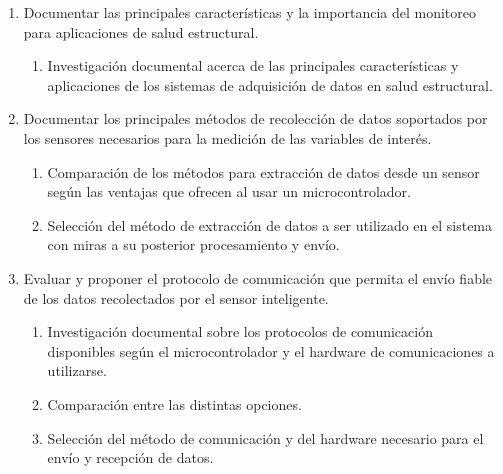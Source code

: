 \documentclass[12pt,letterpaper]{article}
\begin{document}
\begin{enumerate}[1.]



	\item Documentar las principales características y la importancia del monitoreo para aplicaciones de salud estructural.

	      \begin{enumerate}

		      \item Investigación documental acerca de las principales características y aplicaciones de los sistemas de adquisición de datos en salud estructural.


	      \end{enumerate}

	\item  Documentar los principales métodos de recolección de datos soportados por los sensores necesarios para la medición de las variables de interés.


	      \begin{enumerate}

			  \item Comparación de los métodos para extracción de datos desde un sensor según las ventajas que ofrecen al usar un microcontrolador.

		      \item Selección del método de extracción de datos a ser utilizado en el sistema con miras a su posterior procesamiento y envío.

	      \end{enumerate}


	\item Evaluar y proponer el protocolo de comunicación que permita el envío fiable de los datos recolectados por el sensor inteligente.

	      \begin{enumerate}

		      \item Investigación documental sobre los protocolos de comunicación disponibles según el microcontrolador y el hardware de comunicaciones a utilizarse.

		      \item Comparación entre las distintas opciones.

		      \item Selección del método de comunicación y del hardware necesario para el envío y recepción de datos.

	      \end{enumerate}



\end{enumerate}
\end{document}
